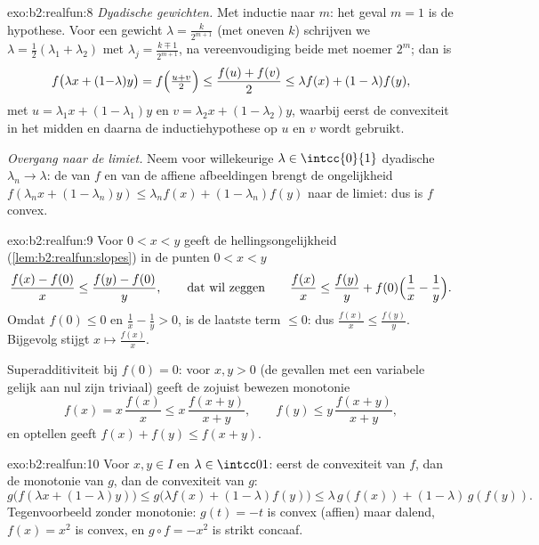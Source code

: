 \begin{solution}{exo:b2:realfun:8}
\emph{Dyadische gewichten.} Met inductie naar $m$: het geval $m =
1$ is de hypothese. Voor een gewicht $\lambda = \frac{k}{2^{m+1}}$
(met oneven $k$) schrijven we $\lambda = \frac12(\lambda_1 +
\lambda_2)$ met $\lambda_j = \frac{k \mp 1}{2^{m+1}}$, na
vereenvoudiging beide met noemer $2^m$; dan is
\[
f\bigl(\lambda x + (1{-}\lambda)y\bigr)
= f\Bigl(\tfrac{u + v}{2}\Bigr)
\leq \frac{f(u) + f(v)}{2}
\leq \lambda f(x) + (1 - \lambda) f(y),
\]
met $u = \lambda_1 x + (1 - \lambda_1)y$ en $v = \lambda_2 x +
(1-\lambda_2)y$, waarbij eerst de convexiteit in het midden en
daarna de inductiehypothese op $u$ en $v$ wordt gebruikt.

\emph{Overgang naar de limiet.} Neem voor willekeurige $\lambda \in
\intcc{0}{1}$ dyadische $\lambda_n \to \lambda$: de 
van $f$ en van de affiene afbeeldingen brengt de ongelijkheid
$f(\lambda_n x + (1-\lambda_n)y) \leq \lambda_n f(x) +
(1-\lambda_n)f(y)$ naar de limiet: dus is $f$ convex.
\end{solution}

\begin{solution}{exo:b2:realfun:9}
Voor $0 < x < y$ geeft de hellingsongelijkheid
(\cref{lem:b2:realfun:slopes}) in de punten $0 < x < y$
\[
\frac{f(x) - f(0)}{x} \leq \frac{f(y) - f(0)}{y},
\qquad\text{dat wil zeggen}\qquad
\frac{f(x)}{x} \leq \frac{f(y)}{y} +
f(0)\Bigl(\frac1x - \frac1y\Bigr).
\]
Omdat $f(0) \leq 0$ en $\frac1x - \frac1y > 0$, is de laatste term
$\leq 0$: dus $\frac{f(x)}{x} \leq \frac{f(y)}{y}$. Bijgevolg
stijgt $x \mapsto \frac{f(x)}x$.

Superadditiviteit bij $f(0) = 0$: voor $x, y > 0$ (de gevallen met
een variabele gelijk aan nul zijn triviaal) geeft de zojuist
bewezen monotonie
\[
f(x) = x\,\frac{f(x)}{x} \leq x\,\frac{f(x+y)}{x+y},
\qquad
f(y) \leq y\,\frac{f(x+y)}{x+y},
\]
en optellen geeft $f(x) + f(y) \leq f(x+y)$.
\end{solution}

\begin{solution}{exo:b2:realfun:10}
Voor $x, y \in I$ en $\lambda \in \intcc01$: eerst de convexiteit
van $f$, dan de monotonie van $g$, dan de convexiteit van $g$:
\[
g\bigl(f(\lambda x + (1{-}\lambda)y)\bigr)
\leq g\bigl(\lambda f(x) + (1{-}\lambda)f(y)\bigr)
\leq \lambda\,g(f(x)) + (1{-}\lambda)\,g(f(y)).
\]
Tegenvoorbeeld zonder monotonie: $g(t) = -t$ is convex (affien)
maar dalend, $f(x) = x^2$ is convex, en $g \circ f = -x^2$ is
strikt concaaf.
\end{solution}

